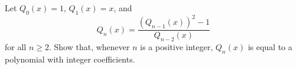 Let $Q_0(x) = 1$, $Q_1(x) = x$, and
\[
Q_n(x) = \frac{(Q_{n-1}(x))^2 - 1}{Q_{n-2}(x)}
\]
for all $n \geq 2$. Show that, whenever $n$ is a positive integer, $Q_n(x)$ is equal to a polynomial with integer coefficients.
